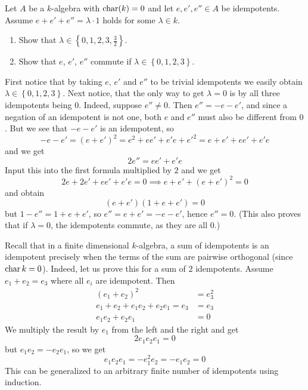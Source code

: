 \documentclass[a4paper, 12pt]{article}
\begin{document}
\begin{Exercise}
    Let $A$ be a $k$-algebra with $\operatorname{char}(k) = 0$ and let $e, e', e'' \in A$ be idempotents.
    Assume $e + e' + e'' = \lambda \cdot 1$ holds for some $\lambda \in k$.
    \begin{enumerate}[label=(\alph*)]
        \item
            Show that $\lambda \in \left\{ 0, 1, 2, 3, \frac{3}{2} \right\}$.
        \item
            Show that $e$, $e'$, $e''$ commute if $\lambda \in \left\{0, 1, 2, 3 \right\}$.
    \end{enumerate}

    First notice that by taking $e$, $e'$ and $e''$ to be trivial idempotents we easily obtain $\lambda \in \left\{ 0, 1, 2, 3 \right\}$.
    Next notice, that the only way to get $\lambda = 0$ is by all three idempotents being $0$.
    Indeed, suppose $e'' \neq 0$.
    Then $e'' = -e - e'$, and since a negation of an idempotent is not one, both $e$ and $e''$ must also be different from $0$.
    But we see that $-e -e'$ is an idempotent, so
    \[
        -e - e' = (e + e')^2 = e^2 + e e' + e' e + e'^2 = e + e' + ee' + e'e
    \]
    and we get
    \[
        2e'' = ee' + e'e
    \]
    Input this into the first formula multiplied by $2$ and we get
    \[
        2e + 2e' + ee' + e'e = 0 \implies e + e' + (e + e')^2 = 0
    \]
    and obtain
    \[
        (e + e')(1 + e + e') = 0
    \]
    but $1 - e'' = 1 + e + e'$, so $e'' = e + e' = -e -e'$, hence $e'' = 0$.
    (This also proves that if $\lambda = 0$, the idempotents commute, as they are all $0$.)

    Recall that in a finite dimensional $k$-algebra, a sum of idempotents is an idempotent precisely when the terms of the sum are pairwise orthogonal (since $\operatorname{char} k = 0$).
    Indeed, let us prove this for a sum of $2$ idempotents.
    Assume $e_1 + e_2 = e_3$ where all $e_i$ are idempotent.
    Then
    \begin{align*}
        (e_1 + e_2)^2 &= e_3^2 \\
        e_1 + e_2 + e_1e_2 + e_2e_1 = e_3 &= e_3 \\
        e_1e_2 + e_2e_1 &= 0
    \end{align*}
    We multiply the result by $e_1$ from the left and the right and get
    \[
        2e_1e_2e_1 = 0
    \]
    but $e_1e_2 = -e_2e_1$, so we get
    \[
        e_1e_2e_1 = -e_1^2e_2 = -e_1e_2 = 0
    \]
    This can be generalized to an arbitrary finite number of idempotents using induction.


\end{Exercise}
\end{document}
